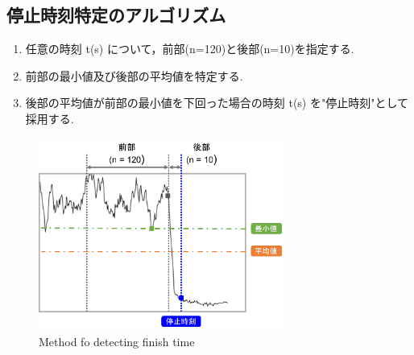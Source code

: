 \documentclass[twocolumn,a4j]{jsarticle}
\begin{document}
\subsection{停止時刻特定のアルゴリズム}
\begin{enumerate}[(1)]
    \item 任意の時刻 t(s) について，前部(n=120)と後部(n=10)を指定する.
    \item 前部の最小値及び後部の平均値を特定する.
    \item 後部の平均値が前部の最小値を下回った場合の時刻 t(s) を"停止時刻"として採用する.
\end{enumerate}
\begin{figure}[htbp]
    \footnotesize
    \begin{center}
        \includegraphics[width=80mm]{images/finish.png}
        \caption{Method fo detecting finish time}
    \end{center}
\end{figure}
\end{document}
